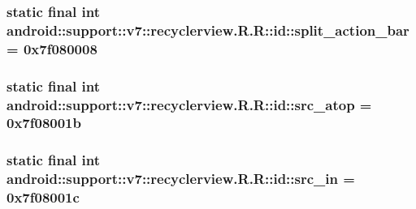 \hypertarget{classandroid_1_1support_1_1v7_1_1recyclerview_1_1_r_1_1id_e259a1c9d0c833406c31802167ec9531}{
\subsubsection[{split\_\-action\_\-bar}]{\setlength{\rightskip}{0pt plus 5cm}static final int android::support::v7::recyclerview.R.R::id::split\_\-action\_\-bar = 0x7f080008}}
\label{classandroid_1_1support_1_1v7_1_1recyclerview_1_1_r_1_1id_e259a1c9d0c833406c31802167ec9531}


\hypertarget{classandroid_1_1support_1_1v7_1_1recyclerview_1_1_r_1_1id_c1bc6650b2db74cfff1d2bd9de7962c9}{
\subsubsection[{src\_\-atop}]{\setlength{\rightskip}{0pt plus 5cm}static final int android::support::v7::recyclerview.R.R::id::src\_\-atop = 0x7f08001b}}
\label{classandroid_1_1support_1_1v7_1_1recyclerview_1_1_r_1_1id_c1bc6650b2db74cfff1d2bd9de7962c9}


\hypertarget{classandroid_1_1support_1_1v7_1_1recyclerview_1_1_r_1_1id_e1f949a41faa276bd2c448531964d0d2}{
\subsubsection[{src\_\-in}]{\setlength{\rightskip}{0pt plus 5cm}static final int android::support::v7::recyclerview.R.R::id::src\_\-in = 0x7f08001c}}
\label{classandroid_1_1support_1_1v7_1_1recyclerview_1_1_r_1_1id_e1f949a41faa276bd2c448531964d0d2}


